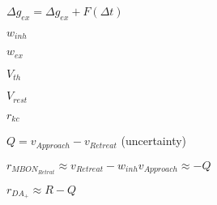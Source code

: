$\Delta g_{ex} = \Delta g_{ex} + F(\Delta t)$

$w_{inh}$

$w_{ex}$

$V_{th}$

$V_{rest}$

$r_{kc}$

$Q = v_{Approach} - v_{Retreat}$ (uncertainty)


$r_{MBON_{Retrat}} \approx v_{Retreat} - w_{inh} v_{Approach} \approx -Q $ 

$r_{DA_{+}} \approx R-Q$ 